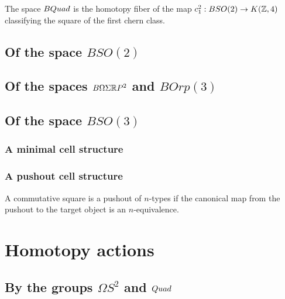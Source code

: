 \documentclass{amsart}
\begin{document}
\begin{definition}
The space $BQuad$ is the homotopy fiber of the map $c_1^2: BSO(2) \rightarrow K(\mathbb Z,4)$ classifying the square of the first chern class.
\end{definition}



\subsection{Of the space $BSO(2)$}


\subsection{Of the spaces $B \Omega \Sigma \mathbb R P^2$ and $B Orp(3)$}


\subsection{Of the space $BSO(3)$}

\subsubsection{A minimal cell structure}

\subsubsection{A pushout cell structure}


\begin{definition}
A commutative square is a pushout of $n$-types if the canonical map from the pushout to the target object is an $n$-equivalence.
\end{definition}

\section{Homotopy actions}


\subsection{By the groups $\Omega S^2$ and $Quad$}
\end{document}
